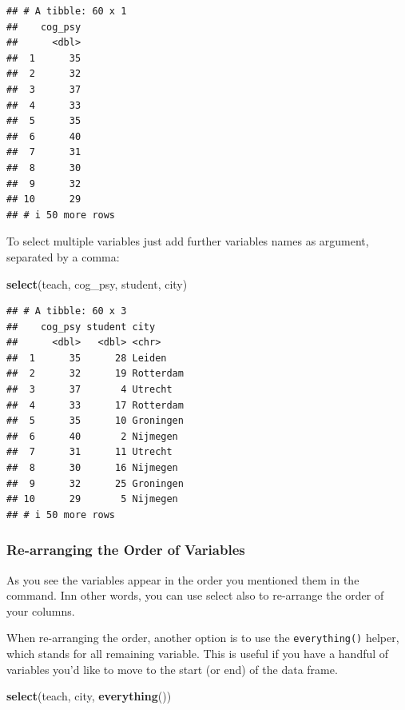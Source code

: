 \documentclass[
]{scrartcl}
\newenvironment{Shaded}{\begin{snugshade}}{\end{snugshade}}
\newcommand{\FunctionTok}[1]{\textcolor[rgb]{0.13,0.29,0.53}{\textbf{#1}}}
\newcommand{\NormalTok}[1]{#1}
\begin{document}
\begin{verbatim}
## # A tibble: 60 x 1
##    cog_psy
##      <dbl>
##  1      35
##  2      32
##  3      37
##  4      33
##  5      35
##  6      40
##  7      31
##  8      30
##  9      32
## 10      29
## # i 50 more rows
\end{verbatim}

To select multiple variables just add further variables names as argument, separated by a comma:

\begin{Shaded}
\begin{Highlighting}[]
\FunctionTok{select}\NormalTok{(teach, cog\_psy, student, city)}
\end{Highlighting}
\end{Shaded}

\begin{verbatim}
## # A tibble: 60 x 3
##    cog_psy student city     
##      <dbl>   <dbl> <chr>    
##  1      35      28 Leiden   
##  2      32      19 Rotterdam
##  3      37       4 Utrecht  
##  4      33      17 Rotterdam
##  5      35      10 Groningen
##  6      40       2 Nijmegen 
##  7      31      11 Utrecht  
##  8      30      16 Nijmegen 
##  9      32      25 Groningen
## 10      29       5 Nijmegen 
## # i 50 more rows
\end{verbatim}

\subsubsection{Re-arranging the Order of Variables}\label{re-arranging-the-order-of-variables}

As you see the variables appear in the order you mentioned them in the command. Inn other words, you can use select also to re-arrange the order of your columns.

When re-arranging the order, another option is to use the \texttt{everything()} helper, which stands for all remaining variable. This is useful if you have a handful of variables you'd like to move to the start (or end) of the data frame.

\begin{Shaded}
\begin{Highlighting}[]
\FunctionTok{select}\NormalTok{(teach,  city, }\FunctionTok{everything}\NormalTok{())}
\end{Highlighting}
\end{Shaded}
\end{document}
